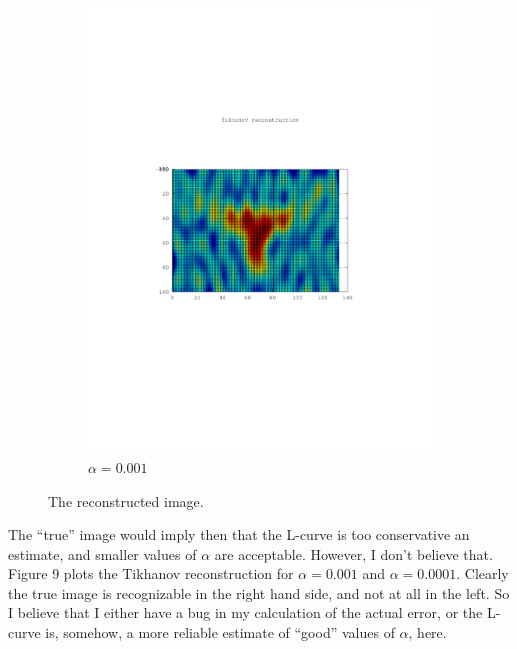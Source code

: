 \documentclass{article}
\begin{document}
\begin{figure}[!htb]
\begin{subfigure}[bh]{0.65\textwidth}
                \includegraphics[width=\textwidth]{plots/tikrecon001.pdf}
                \caption{$\alpha=0.001$}
        \end{subfigure}
 \caption{The reconstructed image.}  
\label{fig:tik}
\end{figure}

The ``true'' image would imply then that the L-curve is too conservative
an estimate, and smaller values of $\alpha$ are acceptable. However, I
don't believe that. Figure 9 plots the Tikhanov
reconstruction for $\alpha = 0.001$ and $\alpha = 0.0001$. Clearly the
true image is recognizable in the right hand side, and not at all in the
left. So I believe that I either have a bug in my calculation of the
actual error, or the L-curve is, somehow, a more reliable estimate of
``good'' values of $\alpha$, here. 
\end{document}
